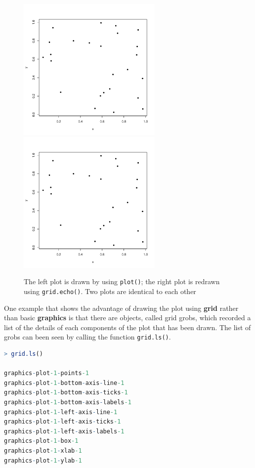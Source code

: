 \documentclass[11pt,twoside]{report}
\begin{document}
\begin{figure}[h]
	\begin{center}
		\includegraphics[height = 7cm, width = 7cm]{figure/report_basic_demo_1.pdf}
		\includegraphics[height = 7cm, width = 7cm]{figure/report_basic_demo_1.pdf}
		\caption{The left plot is drawn by using \texttt{plot()}; the right plot is redrawn using \texttt{grid.echo()}. Two plots are identical to each other}
		\label{figure_1.1}
	\end{center}
\end{figure}
\newpage
One example that shows the advantage of drawing the plot using \textbf{grid} rather than basic \textbf{graphics} is that there are objects, called grid grobs, which recorded a list of the details of each components of the plot that has been drawn. The list of grobs can been seen by calling the function \texttt{grid.ls()}.
\begin{lstlisting}[language = R]
> grid.ls()

graphics-plot-1-points-1
graphics-plot-1-bottom-axis-line-1
graphics-plot-1-bottom-axis-ticks-1
graphics-plot-1-bottom-axis-labels-1
graphics-plot-1-left-axis-line-1
graphics-plot-1-left-axis-ticks-1
graphics-plot-1-left-axis-labels-1
graphics-plot-1-box-1
graphics-plot-1-xlab-1
graphics-plot-1-ylab-1
\end{lstlisting}
\end{document}
